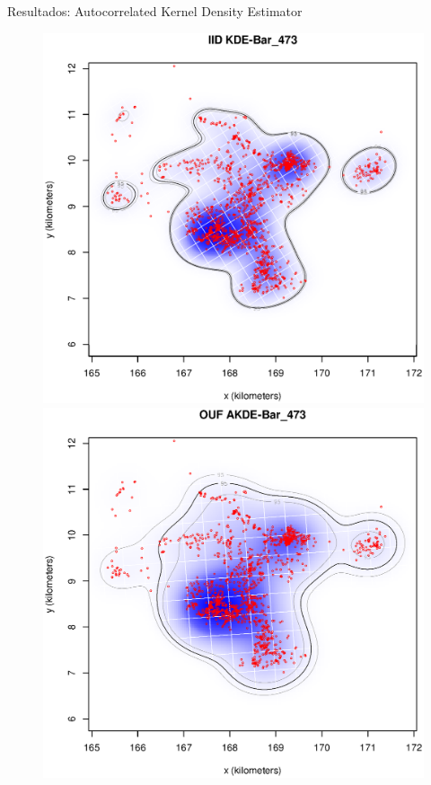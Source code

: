 \documentclass[11pt]{beamer}
\begin{document}
\begin{frame}{Resultados: Autocorrelated Kernel Density Estimator}

        \begin{figure}
            \includegraphics[scale=0.2]{images/iid_kde_Bar_473}
            \includegraphics[scale=0.2]{images/ouf_kde_Bar_473}

\end{figure}
\end{frame}
\end{document}
